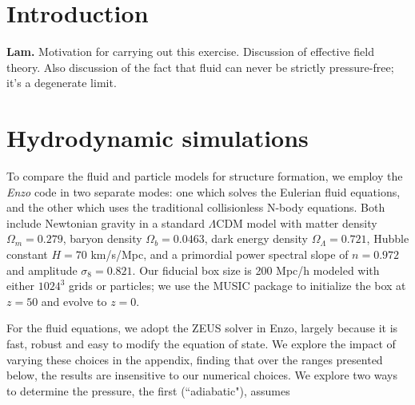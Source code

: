 \documentclass[aps,showpacs,twocolumn,floats,prd,superscriptaddress,nofootinbib]{revtex4}
\begin{document}

\maketitle

\section{Introduction}

{\bf Lam.} Motivation for carrying out this exercise.
Discussion of effective field theory. Also discussion
of the fact that fluid can never be strictly pressure-free;
it's a degenerate limit.

\section{Hydrodynamic simulations}

To compare the fluid and particle models for structure formation, we
employ the {\it Enzo} code \cite{Enzo2014} in two separate modes:
one which solves the Eulerian fluid equations, and the other which
uses the traditional collisionless N-body equations.  Both include
Newtonian gravity in a standard $\Lambda$CDM model with
matter density $\Omega_m = 0.279$, baryon density $\Omega_b = 0.0463$,
dark energy density $\Omega_\Lambda = 0.721$, Hubble constant
$H = 70$ km/s/Mpc, and a primordial power spectral slope of $n=0.972$
and amplitude $\sigma_8 = 0.821$.  Our fiducial box
size is 200 Mpc/h modeled with either $1024^3$ grids or particles;
we use the MUSIC package \cite{MUSIC} to initialize the box at $z=50$ and evolve
to $z=0$.  

For the fluid equations, we adopt the ZEUS solver in Enzo,
largely because it is fast, robust and easy to modify the equation of state.
We explore the impact of varying these choices in the appendix, finding
that over the ranges presented below, the results are insensitive to our
numerical choices.  We explore two ways to determine the pressure, the 
first (``adiabatic"), assumes




\end{document}
